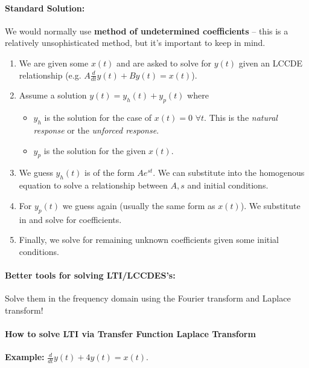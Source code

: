 \documentclass[a4paper,12pt]{report}
\begin{document}
\paragraph{Standard Solution: } We would normally use \textbf{method of undetermined coefficients} -- this is a relatively unsophisticated method, but it's important to keep in mind. 

\begin{enumerate}
\item We are given some $x(t)$ and are asked to solve for $y(t)$ given an LCCDE relationship (e.g. $A\frac{d}{dt}y(t) + B y(t) = x(t)$).
\item Assume a solution $y(t) = y_h(t) + y_p(t)$ where 
\begin{itemize} 
\item $y_h$ is the solution for the case of $x(t) = 0\,\,\forall t$. This is the \textit{natural response} or the \textit{unforced response}.
\item $y_p$ is the solution for the given $x(t)$.
\end{itemize}

\item We guess $y_h(t)$ is of the form $Ae^{st}$. We can substitute into the homogenous equation to solve a relationship between $A, s$ and initial conditions.
\item For $y_p(t)$ we guess again (usually the same form as $x(t)$). We substitute in and solve for coefficients. 
\item Finally, we solve for remaining unknown coefficients given some initial conditions.
\end{enumerate}


\paragraph{Better tools for solving LTI/LCCDES's: } Solve them in the frequency domain using the Fourier transform and Laplace transform! 

\paragraph{How to solve LTI via Transfer Function Laplace Transform} 
\textbf{Example: } $\frac{d}{dt} y(t) + 4y(t) = x(t)$. 
\end{document}
